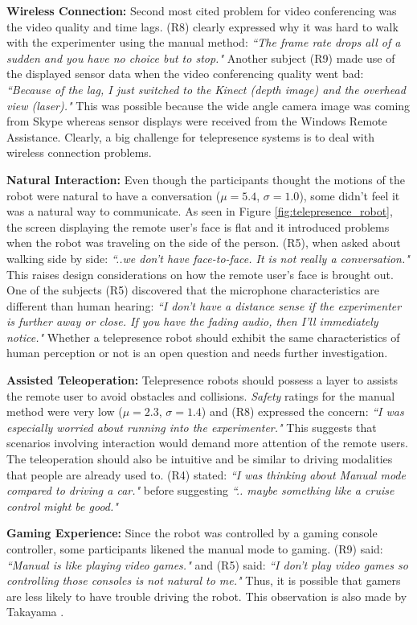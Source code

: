 \textbf{Wireless Connection:} Second most cited problem for video conferencing was the video quality and time lags. (R8) clearly expressed why it was hard to walk with the experimenter using the manual method: \emph{``The frame rate drops all of a sudden and you have no choice but to stop."} Another subject (R9) made use of the displayed sensor data when the video conferencing quality went bad: \emph{``Because of the lag, I just switched to the Kinect (depth image) and the overhead view (laser)."} This was possible because the wide angle camera image was coming from Skype whereas sensor displays were received from the Windows Remote Assistance. Clearly, a big challenge for telepresence systems is to deal with wireless connection problems.

\textbf{Natural Interaction:} Even though the participants thought the motions of the robot were natural to have a conversation ($\mu=5.4$, $\sigma=1.0$), some didn't feel it was a natural way to communicate. As seen in Figure \ref{fig:telepresence_robot}, the screen displaying the remote user's face is flat and it introduced problems when the robot was traveling on the side of the person. (R5), when asked about walking side by side: \emph{``..we don't have face-to-face. It is not really a conversation."} This raises design considerations on how the remote user's face is brought out. One of the subjects (R5) discovered that the microphone characteristics are different than human hearing: \emph{``I don't have a distance sense if the experimenter is further away or close. If you have the fading audio, then I'll immediately notice."} Whether a telepresence robot should exhibit the same characteristics of human perception or not is an open question and needs further investigation.

\textbf{Assisted Teleoperation:} Telepresence robots should possess a layer to assists the remote user to avoid obstacles and collisions. \emph{Safety} ratings for the manual method were very low ($\mu=2.3$, $\sigma=1.4$) and (R8) expressed the concern: \emph{``I was especially worried about running into the experimenter."} This suggests that scenarios involving interaction would demand more attention of the remote users. The teleoperation should also be intuitive and be similar to driving modalities that people are already used to. (R4) stated: \emph{``I was thinking about Manual mode compared to driving a car."} before suggesting \emph{``.. maybe something like a cruise control might be good."}

\textbf{Gaming Experience:} Since the robot was controlled by a gaming console controller, some participants likened the manual mode to gaming. (R9) said: \emph{``Manual is like playing video games."} and (R5) said: \emph{``I don't play video games so controlling those consoles is not natural to me."} Thus, it is possible that gamers are less likely to have trouble driving the robot. This observation is also made by Takayama \cite{takayama2011assisted}.

